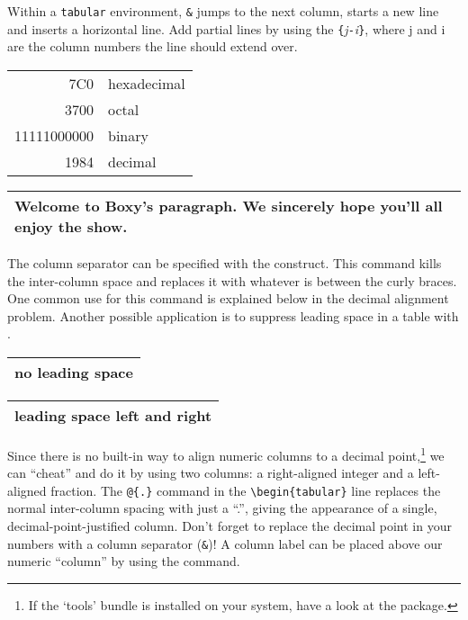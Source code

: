 Within a \texttt{tabular} environment, \texttt{\&} jumps to the next
column, \ci{\bs} starts a new line and  inserts a horizontal
line.  Add partial lines by using the \texttt{\{}\emph{j}\texttt{-}\emph{i}\texttt{\}},
where j and i are the column numbers the line should extend over.


\begin{example}
\begin{tabular}{|r|l|}
\hline
7C0 & hexadecimal \\
3700 & octal \\ \cline{2-2}
11111000000 & binary \\
\hline \hline
1984 & decimal \\
\hline
\end{tabular}
\end{example}

\begin{example}
\begin{tabular}{|p{4.7cm}|}
\hline
Welcome to Boxy's paragraph.
We sincerely hope you'll 
all enjoy the show.\\
\hline 
\end{tabular}
\end{example}

The column separator can be specified with the 
construct. This command kills the inter-column space and replaces it
with whatever is between the curly braces.  One common use for
this command is explained below in the decimal alignment problem.
Another possible application is to suppress leading space in a table with
.

\begin{example}
\begin{tabular}{@{} l @{}}
\hline 
no leading space\\
\hline
\end{tabular}
\end{example}

\begin{example}
\begin{tabular}{l}
\hline
leading space left and right\\
\hline
\end{tabular}
\end{example}

%
%

 Since there is no built-in way to align
numeric columns to a decimal point,\footnote{If the `tools' bundle is
  installed on your system, have a look at the  package.}
we can ``cheat'' and do it by using two columns: a right-aligned
integer and a left-aligned fraction. The \verb|@{.}| command in the
\verb|\begin{tabular}| line replaces the normal inter-column spacing with
just a ``.'', giving the appearance of a single,
decimal-point-justified column.  Don't forget to replace the decimal
point in your numbers with a column separator (\verb|&|)! A column label
can be placed above our numeric ``column'' by using the
 command.
 
